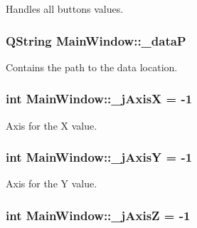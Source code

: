 Handles all buttons values. 

\hypertarget{class_main_window_aaccbe653019df03668429890e325ac21}{}
\subsubsection[{\+\_\+data\+P}]{\setlength{\rightskip}{0pt plus 5cm}Q\+String Main\+Window\+::\+\_\+data\+P\hspace{0.3cm}{\ttfamily [private]}}\label{class_main_window_aaccbe653019df03668429890e325ac21}


Contains the path to the data location. 

\hypertarget{class_main_window_a282d4090e96c676578c4336391b1af08}{}
\subsubsection[{\+\_\+j\+Axis\+X}]{\setlength{\rightskip}{0pt plus 5cm}int Main\+Window\+::\+\_\+j\+Axis\+X = -\/1\hspace{0.3cm}{\ttfamily [private]}}\label{class_main_window_a282d4090e96c676578c4336391b1af08}


Axis for the X value. 

\hypertarget{class_main_window_aaaced09ce813bbcac92047f5ef39f182}{}
\subsubsection[{\+\_\+j\+Axis\+Y}]{\setlength{\rightskip}{0pt plus 5cm}int Main\+Window\+::\+\_\+j\+Axis\+Y = -\/1\hspace{0.3cm}{\ttfamily [private]}}\label{class_main_window_aaaced09ce813bbcac92047f5ef39f182}


Axis for the Y value. 

\hypertarget{class_main_window_a18cc17eff4ff04ee0aae07c609e82d33}{}
\subsubsection[{\+\_\+j\+Axis\+Z}]{\setlength{\rightskip}{0pt plus 5cm}int Main\+Window\+::\+\_\+j\+Axis\+Z = -\/1\hspace{0.3cm}{\ttfamily [private]}}\label{class_main_window_a18cc17eff4ff04ee0aae07c609e82d33}


